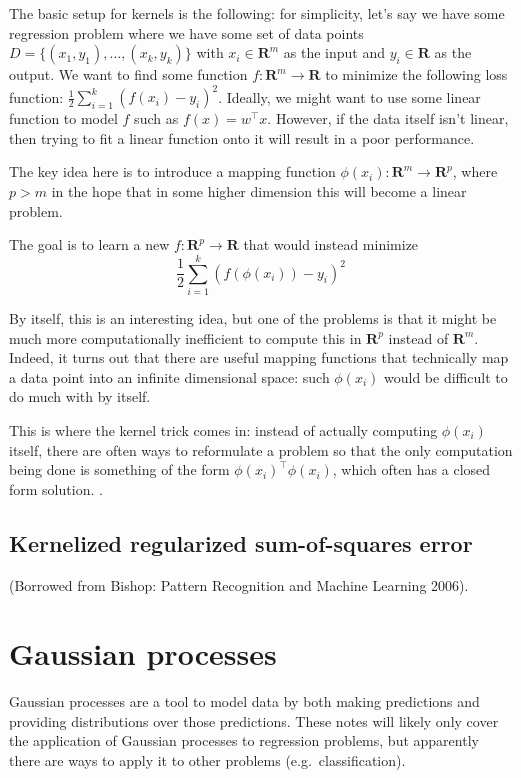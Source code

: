 \documentclass[answers,12pt]{exam}
\begin{document}
The basic setup for kernels is the following:
for simplicity, let's say we have some regression problem where we have some set of data points $D= \{(x_1,y_1),\dots, (x_k,y_k)\}$  with $x_i \in \mathbf{R}^m$ as the input and $y_i \in \mathbf{R}$ as the output.
We want to find some function $f: \mathbf{R}^m \to \mathbf{R}$ to minimize the following loss function: $\frac{1}{2}\sum_{i=1}^{k}{(f(x_i)-y_i)}^2$.
Ideally, we might want to use some linear function to model $f$ such as $f(x) = w^{\top}x$.
However, if the data itself isn't linear, then trying to fit a linear function onto it will result in a poor performance.

The key idea here is to introduce a mapping function $\phi(x_i): \mathbf{R}^m \to \mathbf{R}^p$, where $p>m$ in the hope that in some higher dimension this will become a linear problem. 

The goal is to learn a new $f: \mathbf{R}^p \to \mathbf{R}$ that would instead minimize
\[
    \frac{1}{2}\sum_{i=1}^{k}{(f(\phi(x_i))-y_i)}^2
\]

By itself, this is an interesting idea, but one of the problems is that it might be much more computationally inefficient to compute this in $\mathbf{R}^p$ instead of $\mathbf{R}^m$. 
Indeed, it turns out that there are useful mapping functions that technically map a data point into an infinite dimensional space: such $\phi(x_i)$ would be difficult to do much with by itself.

This is where the kernel trick comes in:
instead of actually computing $\phi(x_i)$ itself, there are often ways to reformulate a problem so that the only computation being done is something of the form $\phi(x_i)^{\top}\phi(x_i)$, which often has a closed form solution. .

\subsection{Kernelized regularized sum-of-squares error}
(Borrowed from Bishop: Pattern Recognition and Machine Learning 2006).


\section{Gaussian processes}
Gaussian processes are a tool to model data by both making predictions and providing distributions over those predictions.
These notes will likely only cover the application of Gaussian processes to regression problems, but apparently there are ways to apply it to other problems (e.g.\ classification).
\end{document}
